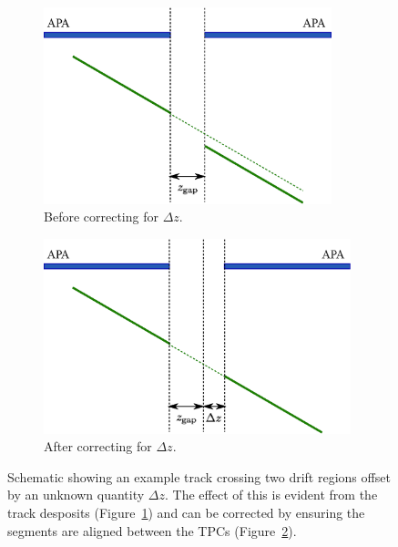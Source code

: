 \begin{figure}
  \centering
  \begin{subfigure}[t]{0.48\linewidth}
    \centering
    \includegraphics[width=0.92\textwidth]{apa_gap_zoffset.eps}
    \caption{Before correcting for $\Delta z$.}
    \label{fig:APAGapZOffsetUncorrected}
  \end{subfigure}
  \hfill
  \begin{subfigure}[t]{0.48\linewidth}
    \centering
    \includegraphics[width=0.98\textwidth]{apa_gap_zoffset_fix.eps}
    \caption{After correcting for $\Delta z$.}
    \label{fig:APAGapZOffsetCorrected}
  \end{subfigure}
  \caption{Schematic showing an example track crossing two drift regions offset by an unknown quantity $\Delta z$.  The effect of this is evident from the track desposits (Figure~\ref{fig:APAGapZOffsetUncorrected}) and can be corrected by ensuring the segments are aligned between the TPCs (Figure~\ref{fig:APAGapZOffsetCorrected}).}
  \label{fig:APAGapZOffset}
\end{figure}


